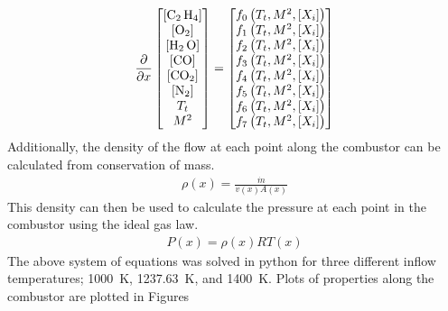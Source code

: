 \documentclass[a4paper]{article}
\begin{document}
\begin{align}
    \frac{\partial}{\partial x} 
    \begin{bmatrix}
    \left[ \ce{C_2 H_4} \right] \\
    \left[ \ce{O_2} \right] \\
    \left[ \ce{H_2 O} \right] \\
    \left[ \ce{CO} \right] \\
    \left[ \ce{CO_2} \right] \\
    \left[ \ce{N_2} \right] \\
    T_t\\
    M^2
    \end{bmatrix}
    =
    \begin{bmatrix}
        f_0 \left(T_t, M^2, \left[ X_i \right]\right)\\
        f_1 \left(T_t, M^2, \left[ X_i \right]\right)\\
        f_2 \left(T_t, M^2, \left[ X_i \right]\right)\\
        f_3 \left(T_t, M^2, \left[ X_i \right]\right)\\
        f_4 \left(T_t, M^2, \left[ X_i \right]\right)\\
        f_5 \left(T_t, M^2, \left[ X_i \right]\right)\\
        f_6 \left(T_t, M^2, \left[ X_i \right]\right)\\
        f_7 \left(T_t, M^2, \left[ X_i \right]\right)
    \end{bmatrix}
\end{align}
Additionally, the density of the flow at each point along the combustor can be calculated from conservation of mass.
\begin{align}
    \rho(x) = \frac{\dot{m}}{v(x) A(x)}
\end{align}
This density can then be used to calculate the pressure at each point in the combustor using the ideal gas law.
\begin{align}
    P(x) = \rho(x) R T(x)
\end{align}
The above system of equations was solved in python for three different inflow temperatures; 1000~K, 1237.63~K, and 1400~K. Plots of properties along the combustor are plotted in Figures 
\end{document}
